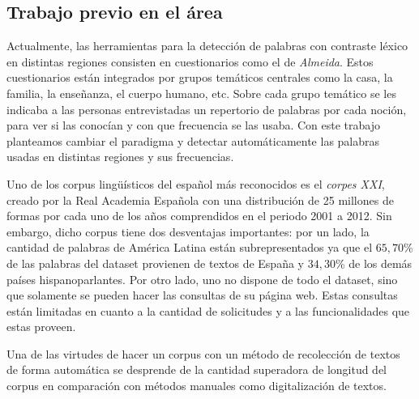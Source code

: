 




\subsection{Trabajo previo en el área}
\par Actualmente, las herramientas para la detección de palabras con contraste léxico en distintas regiones
consisten en cuestionarios como el de \emph{Almeida}\cite{almeida1995variacion}.  Estos cuestionarios están integrados por grupos temáticos centrales como la casa, la familia, la enseñanza, el cuerpo humano, etc. Sobre cada grupo temático se les indicaba a las personas entrevistadas un repertorio de palabras por cada noción, para ver si las conocían y con que frecuencia se las usaba. 
Con este trabajo planteamos cambiar el paradigma y detectar automáticamente las palabras usadas en distintas regiones y sus frecuencias.

Uno de los corpus lingüísticos del español más reconocidos es el \emph{corpes XXI}\cite{espanolabanco}, creado por la Real Academia Española con una distribución de 25 millones de formas por cada uno de los años comprendidos en el periodo 2001 
a 2012. Sin embargo, dicho corpus tiene dos desventajas importantes: por un
lado, la cantidad de palabras de América Latina están subrepresentados ya que el $65,70$\% de las palabras del dataset provienen de textos de España y $34,30$\% de los demás países hispanoparlantes. Por otro lado, uno no dispone de todo el dataset, sino que solamente se pueden hacer las consultas de su página web. Estas consultas están limitadas en cuanto a la cantidad de solicitudes y a las funcionalidades que estas proveen.

Una de las virtudes de hacer un corpus con un método de recolección de textos de forma automática se desprende de la cantidad superadora de longitud del corpus en comparación con métodos manuales como digitalización de textos.

